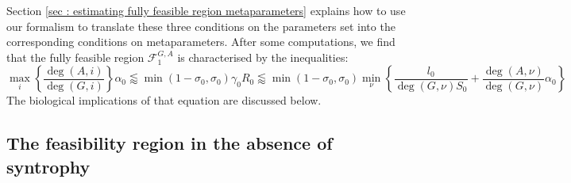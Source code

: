 \documentclass[12pt, titlepage]{report}
\begin{document}
Section \ref{sec : estimating fully feasible region metaparameters} explains how to use our formalism to translate these three conditions on the parameters set into the corresponding conditions on metaparameters. After some computations, we find that the fully feasible region $\mathcal{F}^{G,A}_1$ is characterised by the inequalities:
\begin{equation}
\boxed{
\max_i\left\{\frac{\deg(A,i)}{\deg(G,i)}\right\} \alpha_0
\lessapprox \min(1-\sigma_0, \sigma_0) \gamma_0 R_0
\lessapprox
\min \left(1-\sigma_0, \sigma_0 \right) \min_\nu \left\{ \frac{l_0}{\deg(G,\nu) S_0} + \frac{\deg(A,\nu)}{\deg(G,\nu)}\alpha_0\right\}
}\label{eq : fully feasible volume}
\end{equation}
The biological implications of that equation are discussed below.

\subsection{The feasibility region in the absence of syntrophy}\label{sec : feasibility without syntrophy}
\end{document}
